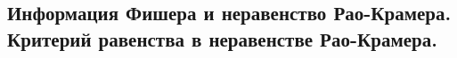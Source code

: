 \subsection{Информация Фишера и неравенство Рао-Крамера. Критерий равенства в неравенстве Рао-Крамера.}